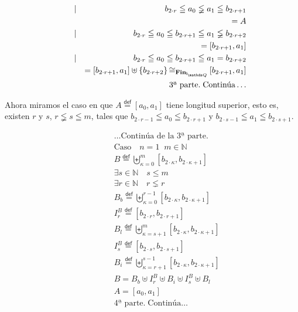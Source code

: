 \documentclass[final,12pt,a4paper,twoside,fleqn]{extbook}
\newcommand{\mathdef}{\ensuremath{\stackrel{\mathsf{def}}{{}={}}}}
\newcommand{\set}[1]{\ensuremath{\left\lbrace{#1}\right\rbrace}}
\newcommand{\setN}{\ensuremath{\mathds{N}}}
\theoremstyle{definition}
\theoremstyle{remark}
\begin{document}
\begin{eqnarray}
      &|& b_{2\cdot r} \leqq a_0 \lneqq a_1 \leqq
      b_{2\cdot r+1}\\
      \qquad&&= A\\
      &|& b_{2\cdot r} \leqq a_0 \leqq b_{2\cdot r+1} \leqq a_1 \lneqq
      b_{2\cdot r+2}\\
      \qquad&&= \left[b_{2\cdot r+1},a_1\right]\\
      &|& b_{2\cdot r} \leqq a_0 \leqq b_{2\cdot r+1} \leqq a_1 =
      b_{2\cdot r+2}\\
      \qquad&&= \left[b_{2\cdot r+1},a_1\right] \uplus \set{b_{2\cdot
      r+2}}{\cong}_{\mathbf{Fin}_{\IQ}} \left[b_{2\cdot r+1},a_1\right]\\
      &&\text{3ª parte.}\;\text{Continúa}\ldots
\end{eqnarray}



	Ahora miramos el caso en que \(A\mathdef\left[a_0,a_1\right]\) tiene
longitud superior, esto es, existen \(r\) y \(s\), \(r \lneqq s \leqq m\),
tales que \(b_{2\cdot r-1} \leqq a_0 \leqq b_{2\cdot r+1}\) y \(b_{2\cdot
s-1} \leqq a_1 \leqq b_{2\cdot s+1}\).  



\begin{eqnarray}
\nonumber
&&\ldots\text{Continúa de la 3ª parte.}\\
&&\text{Caso}\quad n = 1 \;\; m \in \setN\\
&&B \mathdef {\biguplus}_{\kappa=0}^{m} {\left[b_{2\cdot \kappa},b_{2\cdot
\kappa + 1}\right]}\\
&&\exists s \in \setN \quad s \leq m\\
&&\exists r \in \setN \quad r \lneq r\\
\qquad&& B_b \mathdef {\biguplus}_{\kappa=0}^{r-1} {\left[b_{2\cdot
\kappa},b_{2\cdot \kappa + 1}\right]}\\
\qquad&& I_r^B \mathdef {\left[b_{2\cdot r},b_{2\cdot r + 1}\right]}\\
\qquad&& B_l \mathdef {\biguplus}_{\kappa=s+1}^{m} {\left[b_{2\cdot
\kappa},b_{2\cdot \kappa + 1}\right]}\\
\qquad&& I_s^B \mathdef {\left[b_{2\cdot s},b_{2\cdot s + 1}\right]}\\
\qquad&& B_i \mathdef {\biguplus}_{\kappa=r+1}^{s-1} {\left[b_{2\cdot
\kappa},b_{2\cdot \kappa + 1}\right]}\\
&&B = B_b \uplus I_r^B \uplus B_i \uplus I_s^B \uplus B_l\\
&&A = \left[a_0,a_1\right]\\  \nonumber
&&\text{4ª parte.}\;\text{Continúa}\ldots
\end{eqnarray}
\end{document}
